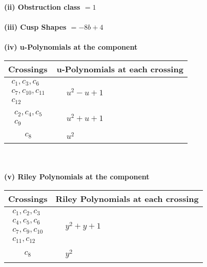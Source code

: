 \documentclass[1p]{elsarticle_modified}
\theoremstyle{definition}
\begin{document}
\flushleft \textbf{(ii) Obstruction class $= 1$}\\~\\
\flushleft \textbf{(iii) Cusp Shapes $= -8 b+4$}\\~\\
\newpage\renewcommand{\arraystretch}{1}
\flushleft \textbf{(iv) u-Polynomials at the component}\newline \\
\begin{tabular}{m{50pt}|m{274pt}}
Crossings & \hspace{64pt}u-Polynomials at each crossing \\
\hline $$\begin{aligned}c_{1},c_{3},c_{6}\\c_{7},c_{10},c_{11}\\c_{12}\end{aligned}$$&$\begin{aligned}
&u^2- u+1
\end{aligned}$\\
\hline $$\begin{aligned}c_{2},c_{4},c_{5}\\c_{9}\end{aligned}$$&$\begin{aligned}
&u^2+u+1
\end{aligned}$\\
\hline $$\begin{aligned}c_{8}\end{aligned}$$&$\begin{aligned}
&u^2
\end{aligned}$\\
\hline
\end{tabular}\\~\\
\newpage\renewcommand{\arraystretch}{1}
\flushleft \textbf{(v) Riley Polynomials at the component}\newline \\
\begin{tabular}{m{50pt}|m{274pt}}
Crossings & \hspace{64pt}Riley Polynomials at each crossing \\
\hline $$\begin{aligned}c_{1},c_{2},c_{3}\\c_{4},c_{5},c_{6}\\c_{7},c_{9},c_{10}\\c_{11},c_{12}\end{aligned}$$&$\begin{aligned}
&y^2+y+1
\end{aligned}$\\
\hline $$\begin{aligned}c_{8}\end{aligned}$$&$\begin{aligned}
&y^2
\end{aligned}$\\
\hline
\end{tabular}\\~\\
\end{document}
